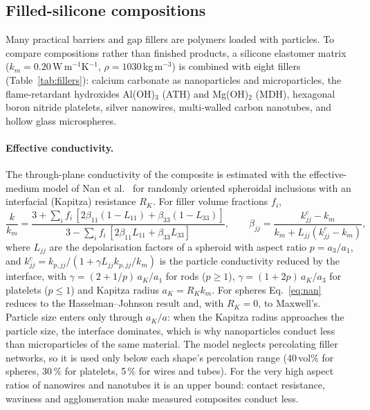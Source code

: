 \documentclass[11pt]{article}
\begin{document}
\subsection{Filled-silicone compositions}
\label{sec:composites-model}

Many practical barriers and gap fillers are polymers loaded with particles. To compare
compositions rather than finished products, a silicone elastomer
matrix~\cite{sylgard184} ($k_m = 0.20$\,W\,m$^{-1}$K$^{-1}$, $\rho = 1030$\,kg\,m$^{-3}$)
is combined with eight fillers (Table~\ref{tab:fillers}): calcium carbonate as
nanoparticles and microparticles, the flame-retardant hydroxides Al(OH)$_3$ (ATH) and
Mg(OH)$_2$ (MDH), hexagonal boron nitride platelets, silver nanowires, multi-walled carbon
nanotubes, and hollow glass microspheres.

\paragraph{Effective conductivity.} The through-plane conductivity of the composite is
estimated with the effective-medium model of Nan et al.~\cite{nan1997} for randomly
oriented spheroidal inclusions with an interfacial (Kapitza) resistance $R_K$. For filler
volume fractions $f_i$,
\begin{equation}
  \frac{k}{k_m} = \frac{3 + \sum_i f_i\,[2\beta_{11}(1-L_{11}) + \beta_{33}(1-L_{33})]}
                       {3 - \sum_i f_i\,[2\beta_{11}L_{11} + \beta_{33}L_{33}]},\qquad
  \beta_{jj} = \frac{k^c_{jj} - k_m}{k_m + L_{jj}(k^c_{jj} - k_m)},
  \label{eq:nan}
\end{equation}
where $L_{jj}$ are the depolarisation factors of a spheroid with aspect ratio
$p = a_3/a_1$, and $k^c_{jj} = k_{p,jj}/(1 + \gamma L_{jj} k_{p,jj}/k_m)$ is the
particle conductivity reduced by the interface, with $\gamma = (2 + 1/p)\,a_K/a_1$ for
rods ($p \ge 1$), $\gamma = (1 + 2p)\,a_K/a_3$ for platelets ($p \le 1$) and Kapitza
radius $a_K = R_K k_m$. For spheres Eq.~\eqref{eq:nan} reduces to the Hasselman--Johnson
result and, with $R_K = 0$, to Maxwell's. Particle size enters only through $a_K/a$:
when the Kapitza radius approaches the particle size, the interface dominates, which is
why nanoparticles conduct less than microparticles of the same material. The model
neglects percolating filler networks, so it is used only below each shape's
percolation range (40\,vol\% for spheres, 30\,\% for platelets, 5\,\% for wires and
tubes). For the very high aspect ratios of nanowires and nanotubes it is an upper bound:
contact resistance, waviness and agglomeration make measured composites conduct less.
\end{document}
